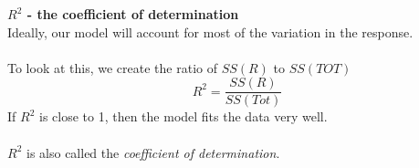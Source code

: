 
\newpage

\Large\textbf{$R^2$ - the coefficient of determination}\large\\

Ideally, our model will account for most of the variation in the response.\\~\\

To look at this, we create the ratio of $SS(R)$ to $SS(TOT)$ 
$$R^2=\frac{SS(R)}{SS(Tot)}$$
If $R^2$ is close to 1, then the model fits the data very well.\\~\\

$R^2$ is also called the {\em coefficient of determination}.  \\~\\

